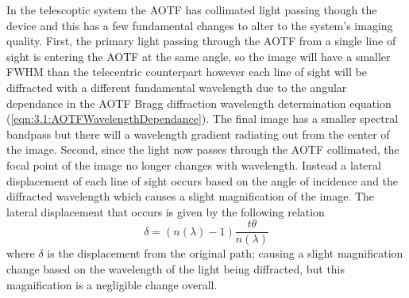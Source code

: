 \documentclass[12pt]{article}
\begin{document}

In the telescoptic system the AOTF has collimated light passing though the device and this has a few fundamental changes to alter to the system's imaging quality. First, the primary light passing through the AOTF from a single line of sight is entering the AOTF at the same angle, so the image will have a smaller FWHM than the telecentric counterpart however each line of sight will be diffracted with a different fundamental wavelength due to the angular dependance in the AOTF Bragg diffraction wavelength determination equation (\autoref{eqn:3.1:AOTFWavelengthDependance}). The final image has a smaller spectral bandpass but there will a wavelength gradient radiating out from the center of the image. Second, since the light now passes through the AOTF collimated, the focal point of the image no longer changes with wavelength. Instead a lateral displacement of each line of sight occurs based on the angle of incidence and the diffracted wavelength which causes a slight magnification of the image. The lateral displacement that occurs is given by the following relation
\begin{equation}
    \delta = (n(\lambda)-1)\frac{t\theta}{n(\lambda)}
    \label{eqn:3.2:planeParallelDiplacement}
\end{equation}
where $\delta$ is the displacement from the original path; causing a slight magnification change based on the wavelength of the light being diffracted, but this magnification is a negligible change overall.

\end{document}

